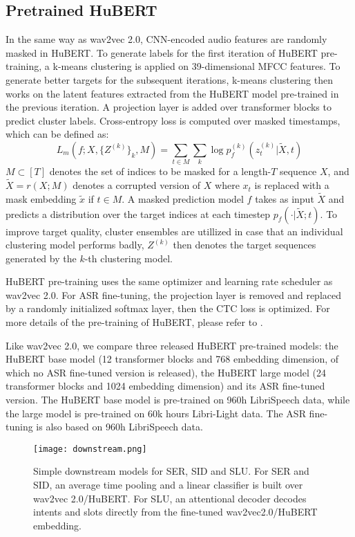 \documentclass{article}
\begin{document}
\subsection{Pretrained HuBERT}
In the same way as wav2vec 2.0, CNN-encoded audio features are randomly masked in HuBERT. To generate labels for the first iteration of HuBERT pre-training, a k-means clustering is applied on 39-dimensional MFCC features. To generate better targets for the subsequent iterations, k-means clustering then works on the latent features extracted from the HuBERT model pre-trained in the previous iteration. A projection layer is added over transformer blocks to predict cluster labels. Cross-entropy loss is computed over masked timestamps, which can be defined as: 
\begin{equation}
  L_m(f;X, \{Z^{(k)}\}_k, M)= \sum_{t \in M}\sum_{k} \log p_f^{(k)}(z_t^{(k)} | \widetilde{X}, t)
\end{equation}
$ M \subset [T]$ denotes the set of indices to be masked for a length-$T$ sequence $X$, and $\widetilde{X}= r(X;M)$ denotes a corrupted version of $X$ where $x_t$ is replaced with a mask embedding $\widetilde{x}$ if $t \in M$. A masked prediction model $f$ takes as input $\widetilde{X}$ and predicts a distribution over the target indices at each timestep $p_f (\cdot |\widetilde{X}; t)$. To improve target quality, cluster ensembles are utillized in case that an individual clustering model performs badly, $Z^{(k)}$ then denotes the target sequences generated by the $k$-th clustering model.

HuBERT pre-training uses the same optimizer and learning rate scheduler as wav2vec 2.0. For ASR fine-tuning, the projection layer is removed and replaced by a randomly initialized softmax layer, then the CTC loss is optimized. For more details of the pre-training of HuBERT, please refer to \cite{HuBERT}.

Like wav2vec 2.0, we compare three released HuBERT pre-trained models: the HuBERT base model (12 transformer blocks and 768 embedding dimension, of which no ASR fine-tuned version is released), the HuBERT large model (24 transformer blocks and 1024 embedding dimension) and its ASR fine-tuned version. The HuBERT base model is pre-trained on 960h LibriSpeech data, while the large model is pre-trained on 60k hours Libri-Light \cite{LibriLight} data. The ASR fine-tuning is also based on 960h LibriSpeech data.

\begin{figure}[t]
  \centering
  \texttt{[image: downstream.png]}
  \caption{Simple downstream models for SER, SID and SLU. For SER and SID, an average time pooling and a linear classifier is built over wav2vec 2.0/HuBERT. For SLU, an attentional decoder decodes intents and slots directly from the fine-tuned wav2vec2.0/HuBERT embedding.}
  \label{fig:speech_production}
\end{figure}
\end{document}

